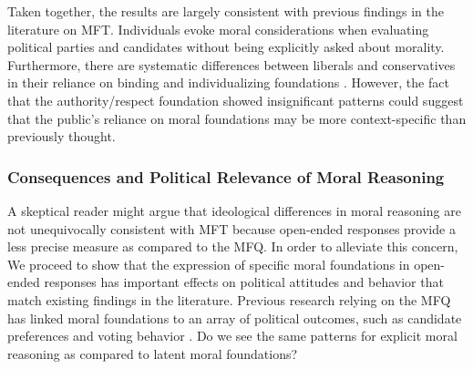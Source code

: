 \documentclass[12pt]{article}
\begin{document}
Taken together, the results are largely consistent with previous findings in the literature on MFT. Individuals evoke moral considerations when evaluating political parties and candidates without being explicitly asked about morality. Furthermore, there are systematic differences between liberals and conservatives in their reliance on binding and individualizing foundations \citep[see][for similar ideological differences when analyzing the content of life-narrative interviews]{mcadams2008family}. However, the fact that the authority/respect foundation showed insignificant patterns could suggest that the public's reliance on moral foundations may be more context-specific than previously thought.


\subsubsection{Consequences and Political Relevance of Moral Reasoning}

A skeptical reader might argue that ideological differences in moral reasoning are not unequivocally consistent with MFT because open-ended responses provide a less precise measure as compared to the MFQ. In order to alleviate this concern, We proceed to show that the expression of specific moral foundations in open-ended responses has important effects on political attitudes and behavior that match existing findings in the literature. Previous research relying on the MFQ has linked moral foundations to an array of political outcomes, such as candidate preferences \citep{iyer2010beyond} and voting behavior \citep{franks2015using}. Do we see the same patterns for explicit moral reasoning as compared to latent moral foundations?
\end{document}
